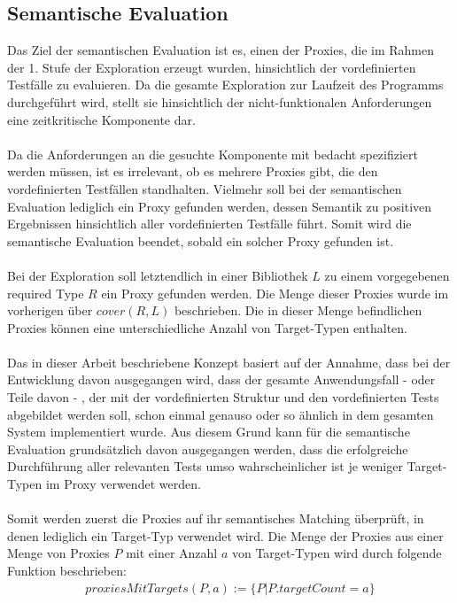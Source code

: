 \documentclass[a4paper,12pt]{article}
\begin{document}
\subsection{Semantische Evaluation}
Das Ziel der semantischen Evaluation ist es, einen der Proxies, die im Rahmen der 1. Stufe der Exploration erzeugt wurden, hinsichtlich der vordefinierten Testfälle zu evaluieren. Da die gesamte Exploration zur Laufzeit des Programms durchgeführt wird, stellt sie hinsichtlich der nicht-funktionalen Anforderungen eine zeitkritische Komponente dar.\\\\
Da die Anforderungen an die gesuchte Komponente mit bedacht spezifiziert werden müssen, ist es irrelevant, ob es mehrere Proxies gibt, die den vordefinierten Testfällen standhalten. Vielmehr soll bei der semantischen Evaluation lediglich ein Proxy gefunden werden, dessen Semantik zu positiven Ergebnissen hinsichtlich aller vordefinierten Testfälle führt. Somit wird die semantische Evaluation beendet, sobald ein solcher Proxy gefunden ist.\\\\
Bei der Exploration soll letztendlich in einer Bibliothek $L$ zu einem vorgegebenen required Type $R$ ein Proxy gefunden werden. Die Menge dieser Proxies wurde im vorherigen über $\mathit{cover(R,L)}$ beschrieben. Die in dieser Menge befindlichen Proxies können eine unterschiedliche Anzahl von Target-Typen enthalten.\\\\
Das in dieser Arbeit beschriebene Konzept basiert auf der Annahme, dass bei der Entwicklung davon ausgegangen wird, dass der gesamte Anwendungsfall - oder Teile davon - , der mit der vordefinierten Struktur und den vordefinierten Tests abgebildet werden soll, schon einmal genauso oder so ähnlich in dem gesamten System implementiert wurde. Aus diesem Grund kann für die semantische Evaluation grundsätzlich davon ausgegangen werden, dass die erfolgreiche Durchführung aller relevanten Tests umso wahrscheinlicher ist je weniger Target-Typen im Proxy verwendet werden.\\\\
Somit werden zuerst die Proxies auf ihr semantisches Matching überprüft, in denen lediglich ein Target-Typ verwendet wird. Die Menge der Proxies aus einer Menge von Proxies $P$ mit einer Anzahl $a$ von Target-Typen wird durch folgende Funktion beschrieben:
\begin{gather*}
proxiesMitTargets(P,a) := \{P | P.targetCount = a\}
\end{gather*}
\end{document}
